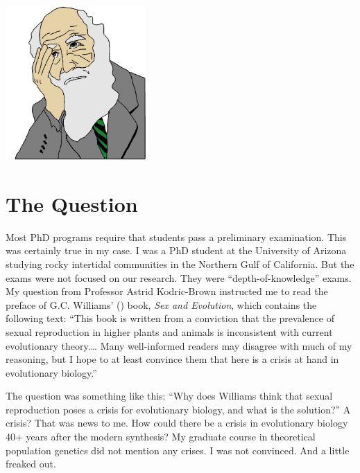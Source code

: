 \documentclass[
  letterpaper,
]{book}
\begin{document}
\begin{center}
\includegraphics[width=0.4\textwidth,height=\textheight]{images/fig1-1.jpeg}
\end{center}

\section{The Question}\label{the-question}

Most PhD programs require that students pass a preliminary examination.
This was certainly true in my case. I was a PhD student at the
University of Arizona studying rocky intertidal communities in the
Northern Gulf of California. But the exams were not focused on our
research. They were ``depth-of-knowledge'' exams. My question from
Professor Astrid Kodric-Brown instructed me to read the preface of G.C.
Williams' () book, \emph{Sex and
Evolution}, which contains the following text: ``This book is written
from a conviction that the prevalence of sexual reproduction in higher
plants and animals is inconsistent with current evolutionary
theory.\ldots{} Many well-informed readers may disagree with much of my
reasoning, but I hope to at least convince them that here is a crisis at
hand in evolutionary biology.''

The question was something like this: ``Why does Williams think that
sexual reproduction poses a crisis for evolutionary biology, and what is
the solution?'' A crisis? That was news to me. How could there be a
crisis in evolutionary biology 40+ years after the modern synthesis? My
graduate course in theoretical population genetics did not mention any
crises. I was not convinced. And a little freaked out.
\end{document}

